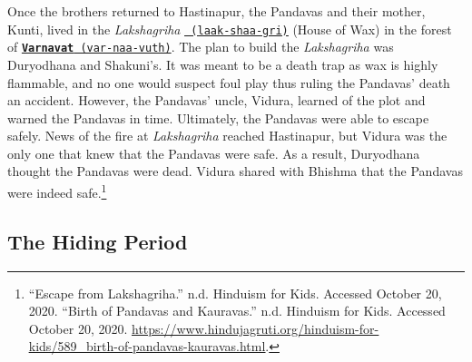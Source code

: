 \documentclass[10pt, letterpaper]{article}
\begin{document}
Once the brothers returned to Hastinapur, the Pandavas and their mother,
Kunti, lived in the \textit{Lakshagriha}
\texttt{\underline{\href{https://drive.google.com/file/d/1O2Fe5xmf1yizyU5i_9_czAq1LKjG-Mgf/view?usp=sharing}{
(laak-shaa-gri)}}} (House of Wax) in the forest of
\texttt{\underline{\href{https://drive.google.com/file/d/1Wyu7hZoFD6tMbyiD59ENtRi3iI0UJVVA/view?usp=sharing}{\textbf{Varnavat}}
(var-naa-vuth)}}. The plan to build the \emph{Lakshagriha} was Duryodhana
and Shakuni's. It was meant to be a death trap as wax is highly
flammable, and no one would suspect foul play thus ruling the Pandavas'
death an accident. However, the Pandavas' uncle, Vidura, learned of the
plot and warned the Pandavas in time. Ultimately, the Pandavas were able
to escape safely. News of the fire at \emph{Lakshagriha} reached
Hastinapur, but Vidura was the only one that knew that the Pandavas were
safe. As a result, Duryodhana thought the Pandavas were dead. Vidura
shared with Bhishma that the Pandavas were indeed safe.\footnote{``Escape
  from Lakshagriha.'' n.d. Hinduism for Kids. Accessed October 20, 2020.
  ``Birth of Pandavas and Kauravas.'' n.d. Hinduism for Kids. Accessed
  October 20, 2020.
  \href{https://www.hindujagruti.org/hinduism-for-kids/589_birth-of-pandavas-kauravas.html}{\underline{https://www.hindujagruti.org/hinduism-for-kids/589\_birth-of-pandavas-kauravas.html}}.} \\

\subsection{The Hiding Period}
\end{document}
